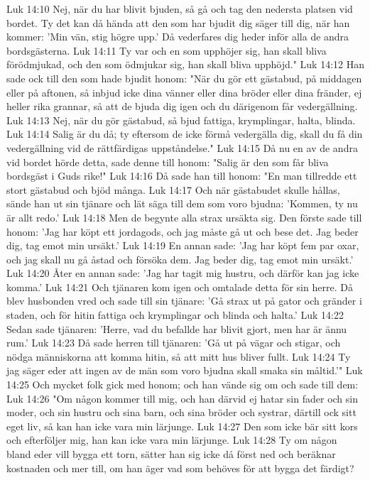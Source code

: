 Luk 14:10  Nej, när du har blivit bjuden, så gå och tag den nedersta platsen vid bordet. Ty det kan då hända att den som har bjudit dig säger till dig, när han kommer: 'Min vän, stig högre upp.' Då vederfares dig heder inför alla de andra bordsgästerna.
Luk 14:11  Ty var och en som upphöjer sig, han skall bliva förödmjukad, och den som ödmjukar sig, han skall bliva upphöjd."
Luk 14:12  Han sade ock till den som hade bjudit honom: "När du gör ett gästabud, på middagen eller på aftonen, så inbjud icke dina vänner eller dina bröder eller dina fränder, ej heller rika grannar, så att de bjuda dig igen och du därigenom får vedergällning.
Luk 14:13  Nej, när du gör gästabud, så bjud fattiga, krymplingar, halta, blinda.
Luk 14:14  Salig är du då; ty eftersom de icke förmå vedergälla dig, skall du få din vedergällning vid de rättfärdigas uppståndelse."
Luk 14:15  Då nu en av de andra vid bordet hörde detta, sade denne till honom: "Salig är den som får bliva bordsgäst i Guds rike!"
Luk 14:16  Då sade han till honom: "En man tillredde ett stort gästabud och bjöd många.
Luk 14:17  Och när gästabudet skulle hållas, sände han ut sin tjänare och lät säga till dem som voro bjudna: 'Kommen, ty nu är allt redo.'
Luk 14:18  Men de begynte alla strax ursäkta sig. Den förste sade till honom: 'Jag har köpt ett jordagods, och jag måste gå ut och bese det. Jag beder dig, tag emot min ursäkt.'
Luk 14:19  En annan sade: 'Jag har köpt fem par oxar, och jag skall nu gå åstad och försöka dem. Jag beder dig, tag emot min ursäkt.'
Luk 14:20  Åter en annan sade: 'Jag har tagit mig hustru, och därför kan jag icke komma.'
Luk 14:21  Och tjänaren kom igen och omtalade detta för sin herre. Då blev husbonden vred och sade till sin tjänare: 'Gå strax ut på gator och gränder i staden, och för hitin fattiga och krymplingar och blinda och halta.'
Luk 14:22  Sedan sade tjänaren: 'Herre, vad du befallde har blivit gjort, men har är ännu rum.'
Luk 14:23  Då sade herren till tjänaren: 'Gå ut på vägar och stigar, och nödga människorna att komma hitin, så att mitt hus bliver fullt.
Luk 14:24  Ty jag säger eder att ingen av de män som voro bjudna skall smaka sin måltid.'"
Luk 14:25  Och mycket folk gick med honom; och han vände sig om och sade till dem:
Luk 14:26  "Om någon kommer till mig, och han därvid ej hatar sin fader och sin moder, och sin hustru och sina barn, och sina bröder och systrar, därtill ock sitt eget liv, så kan han icke vara min lärjunge.
Luk 14:27  Den som icke bär sitt kors och efterföljer mig, han kan icke vara min lärjunge.
Luk 14:28  Ty om någon bland eder vill bygga ett torn, sätter han sig icke då först ned och beräknar kostnaden och mer till, om han äger vad som behöves för att bygga det färdigt?
